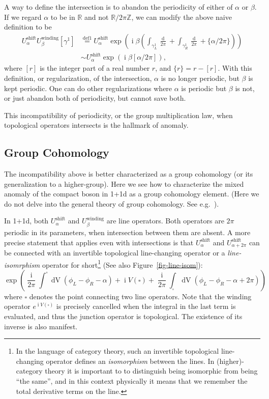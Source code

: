 \documentclass[
  letterpaper,
  DIV=11,
  numbers=noendperiod]{scrreport}
\DeclareMathOperator{\imunit}{i}
\begin{document}
A way to define the intersection is to abandon the periodicity of either
of \(\alpha\) or \(\beta\). If we regard \(\alpha\) to be in
\(\mathbb{R}\) and not \(\mathbb{R}/2\pi\mathbb{Z}\), we can modify the
above naive definition to be \[
\begin{aligned}
U^\text{shift}_\alpha U^\text{winding}_\beta[\gamma^1] &\stackrel{\text{def1}}{=} U^\text{shift}_\alpha \exp\left(\imunit\beta \left(\int_{\gamma^1_L}\frac{\mathop{d\phi_L}}{2\pi} + \int_{\gamma^1_R}\frac{\mathop{d\phi_R}}{2\pi} + \{\alpha/2\pi\}\right)\right)\\
& \sim U^\text{shift}_\alpha \exp\left(\imunit\beta [\alpha/2\pi] \right),
\end{aligned}
\] where \([r]\) is the integer part of a real number \(r\), and
\(\{r\}= r-[r]\). With this definition, or regularization, of the
intersection, \(\alpha\) is no longer periodic, but \(\beta\) is kept
periodic. One can do other regularizations where \(\alpha\) is periodic
but \(\beta\) is not, or just abandon both of periodicity, but cannot
save both.

This incompatibility of periodicity, or the group multiplication law,
when topological operators intersects is the hallmark of anomaly.

\hypertarget{group-cohomology}{%
\subsection{Group Cohomology}\label{group-cohomology}}

The incompatibility above is better characterized as a group cohomology
(or its generalization to a higher-group). Here we see how to
characterize the mixed anomaly of the compact boson in 1+1d as a group
cohomology element. (Here we do not delve into the general theory of
group cohomology. See e.g.~\textcite{TachikawaTasi}).

In 1+1d, both \(U^\text{shift}_\alpha\) and \(U^\text{winding}_\beta\)
are line operators. Both operators are \(2\pi\) periodic in its
parameters, when intersection between them are absent. A more precise
statement that applies even with intersections is that
\(U^\text{shift}_\alpha\) and \(U^\text{shift}_{\alpha+2\pi}\) can be
connected with an invertible topological line-changing operator or a
\emph{line-isomrphism} operator for short\footnote{In the language of
  category theory, such an invertible topological line-changing operator
  defines an \emph{isomorphism} between the lines. In (higher)-category
  theory it is important to to distinguish being isomorphic from being
  ``the same'', and in this context physically it means that we remember
  the total derivative terms on the line.} (See also
Figure~\ref{fig-line-isom}): \[
 \exp\left(\frac{\imunit}{2\pi} \int^\square \mathop{dV}(\phi_L-\phi_R -\alpha)  + \imunit V(\square)  + \frac{\imunit}{2\pi} \int_\square \mathop{dV}(\phi_L-\phi_R -\alpha+2\pi)  \right)
\] where \(\square\) denotes the point connecting two line operators.
Note that the winding operator \(e^{\imunit V(\square)}\) is precisely
cancelled when the integral in the last term is evaluated, and thus the
junction operator is topological. The existence of its inverse is also
manifest.
\end{document}
